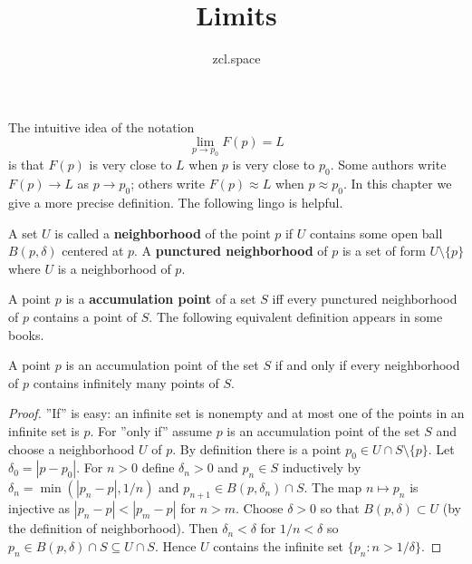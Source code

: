 \documentclass[10pt,a4paper,UTF8]{article}
\author{zcl.space}
\date{}
\title{Limits}
\begin{document}
\maketitle
\tableofcontents
{}
The intuitive idea of the notation
$$
   \lim_{p\to p_0}F(p) = L
$$
is that \(F(p)\) is very close to \(L\) when \(p\) is very close to \(p_0\).
Some authors write \(F(p)\to L\) as \(p\to p_0\);  others write
\(F(p)\approx L\) when \(p\approx p_0\). In this chapter we give a more precise definition.
The following lingo is helpful.

 A set \(U\) is called a \textbf{neighborhood} of the point \(p\) if \(U\) contains some
open ball \(B(p,\delta)\) centered at \(p\).
A \textbf{punctured neighborhood} of \(p\) is
a set of form \(U\setminus\{p\}\) where \(U\) is a neighborhood of \(p\).

A point \(p\) is a \textbf{accumulation point} of a set \(S\)  iff every punctured neighborhood of  \(p\) contains a point of \(S\).
The following equivalent definition appears in some books.

\begin{tikztheorem}
A point \(p\) is an accumulation point of the set \(S\) if and only if every neighborhood
of \(p\) contains infinitely many points of \(S\).
\end{tikztheorem}

\begin{proof}
 ''If'' is easy: an infinite set is nonempty and at most one of the points
in an infinite set is \(p\). For ''only if'' assume
\(p\) is an accumulation point of the set \(S\) and choose a neighborhood \(U\) of \(p\).
By definition there is a point \(p_0\in U\cap S\setminus\{p\}\). Let \(\delta_0=|p-p_0|\).
For \(n>0\)
define \(\delta_n>0\) and \(p_n\in S\) inductively  by \(\delta_n=\min(|p_n-p|,1/n)\) and
\(p_{n+1}\in B(p,\delta_n)\cap S\).
The map \(n\mapsto p_n\) is injective as \(|p_n-p|<|p_m-p|\) for \(n>m\).
Choose \(\delta>0\) so that \(B(p,\delta)\subset U\) (by the definition of neighborhood).
Then \(\delta_n<\delta\) for \(1/n<\delta\) so \(p_n\in B(p,\delta)\cap S\subseteq U\cap S\).
Hence \(U\) contains the infinite set  \(\{p_n:n>1/\delta\}\).
\end{proof}
\end{document}
